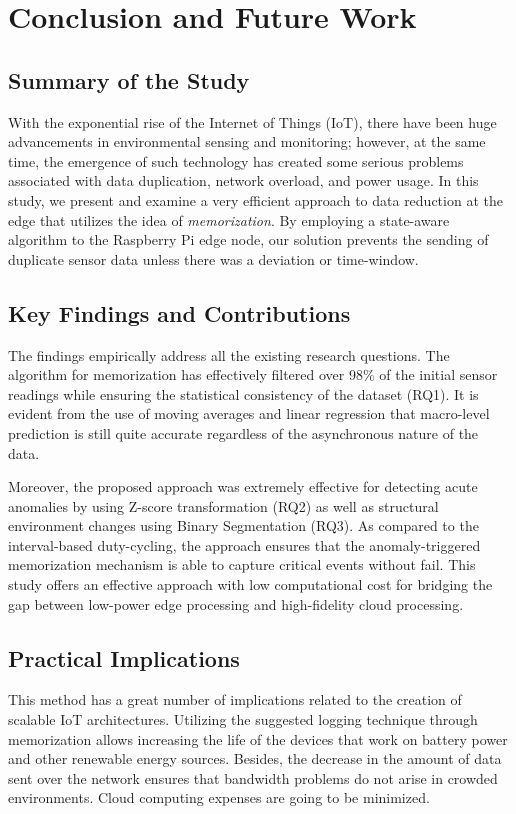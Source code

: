 \chapter{Conclusion and Future Work}
\label{ch:conclusion}

\section{Summary of the Study}
With the exponential rise of the Internet of Things (IoT), there have been huge advancements in environmental sensing and monitoring; however, at the same time, the emergence of such technology has created some serious problems associated with data duplication, network overload, and power usage. In this study, we present and examine a very efficient approach to data reduction at the edge that utilizes the idea of \textit{memorization}. By employing a state-aware algorithm to the Raspberry Pi edge node, our solution prevents the sending of duplicate sensor data unless there was a deviation or time-window.

\section{Key Findings and Contributions}
The findings empirically address all the existing research questions. The algorithm for memorization has effectively filtered over 98\% of the initial sensor readings while ensuring the statistical consistency of the dataset (RQ1). It is evident from the use of moving averages and linear regression that macro-level prediction is still quite accurate regardless of the asynchronous nature of the data.

Moreover, the proposed approach was extremely effective for detecting acute anomalies by using Z-score transformation (RQ2) as well as structural environment changes using Binary Segmentation (RQ3). As compared to the interval-based duty-cycling, the approach ensures that the anomaly-triggered memorization mechanism is able to capture critical events without fail. This study offers an effective approach with low computational cost for bridging the gap between low-power edge processing and high-fidelity cloud processing.

\section{Practical Implications}
This method has a great number of implications related to the creation of scalable IoT architectures. Utilizing the suggested logging technique through memorization allows increasing the life of the devices that work on battery power and other renewable energy sources. Besides, the decrease in the amount of data sent over the network ensures that bandwidth problems do not arise in crowded environments. Cloud computing expenses are going to be minimized.

